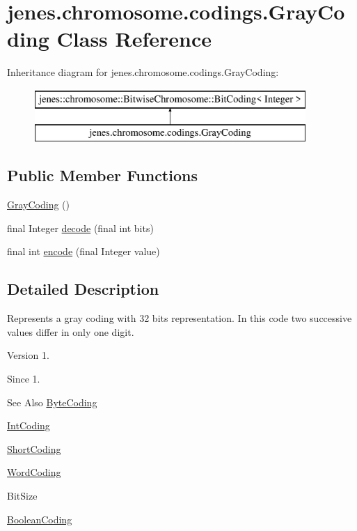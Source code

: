 \hypertarget{classjenes_1_1chromosome_1_1codings_1_1_gray_coding}{\section{jenes.\-chromosome.\-codings.\-Gray\-Coding Class Reference}
\label{classjenes_1_1chromosome_1_1codings_1_1_gray_coding}
}
Inheritance diagram for jenes.\-chromosome.\-codings.\-Gray\-Coding\-:\begin{figure}[H]
\begin{center}
\leavevmode
\includegraphics[height=2.000000cm]{classjenes_1_1chromosome_1_1codings_1_1_gray_coding}
\end{center}
\end{figure}
\subsection*{Public Member Functions}
\begin{DoxyCompactItemize}
\item 
\hyperlink{classjenes_1_1chromosome_1_1codings_1_1_gray_coding_a55dedef21f32baa6e10eec066fc549ba}{Gray\-Coding} ()
\item 
final Integer \hyperlink{classjenes_1_1chromosome_1_1codings_1_1_gray_coding_ab18b4f8ca1b0bed9242254405fde897e}{decode} (final int bits)
\item 
final int \hyperlink{classjenes_1_1chromosome_1_1codings_1_1_gray_coding_ab25d7513076e67bdd6aa15d9797673c0}{encode} (final Integer value)
\end{DoxyCompactItemize}


\subsection{Detailed Description}
Represents a gray coding with 32 bits representation. In this code two successive values differ in only one digit.

\begin{DoxyVersion}{Version}
1. 
\end{DoxyVersion}
\begin{DoxySince}{Since}
1.
\end{DoxySince}
\begin{DoxySeeAlso}{See Also}
\hyperlink{classjenes_1_1chromosome_1_1codings_1_1_byte_coding}{Byte\-Coding} 

\hyperlink{classjenes_1_1chromosome_1_1codings_1_1_int_coding}{Int\-Coding} 

\hyperlink{classjenes_1_1chromosome_1_1codings_1_1_short_coding}{Short\-Coding} 

\hyperlink{classjenes_1_1chromosome_1_1codings_1_1_word_coding}{Word\-Coding} 

Bit\-Size 

\hyperlink{classjenes_1_1chromosome_1_1codings_1_1_boolean_coding}{Boolean\-Coding} 
\end{DoxySeeAlso}


